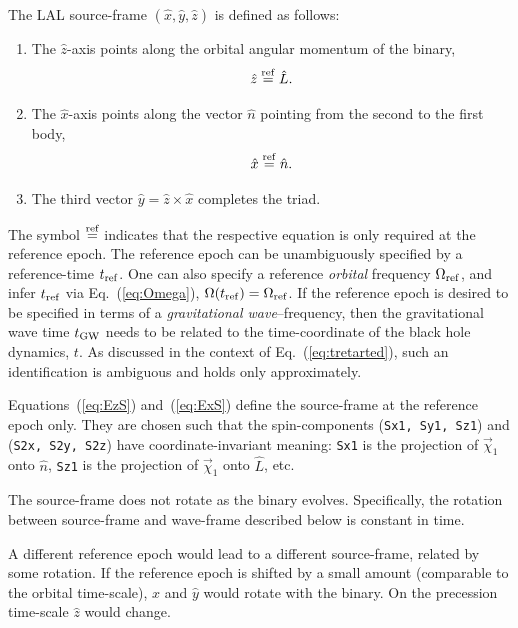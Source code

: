 \documentclass[11pt,tightenlines,article,amssymb,amsmath,amsfonts,superscriptaddress]{revtex4}
\newcommand{\nNR}{\hat{n}}
\newcommand{\lNR}{\hat L}
\newcommand{\tGW}{t_{\rm GW}}
\newcommand{\ExS}{{{\hat x}}}
\newcommand{\EyS}{{{\hat y}}}
\newcommand{\EzS}{{{\hat z}}}
\newcommand{\phiRef}{\Phi} %
\newcommand{\equalref}{\overset{\rm ref}{=}}
\begin{document}
The LAL source-frame $(\ExS, \EyS, \EzS)$ is defined as follows:
\begin{enumerate}
\item The $\EzS$-axis points along the orbital angular momentum of the binary,
  \begin{equation}\label{eq:EzS}
    \EzS\equalref \lNR.
  \end{equation}
\item The $\ExS$-axis points along the vector $\nNR$ pointing from the second
  to the first body,
  \begin{equation}\label{eq:ExS}
    \ExS\equalref\nNR.
  \end{equation}
\item The third vector $\EyS=\EzS\times\ExS$ completes the triad.
\end{enumerate}
The symbol $\equalref$ indicates that the
respective equation is only required at the reference epoch.  The
reference epoch can be unambiguously specified by a reference-time
$t_{\rm ref}$.  One can also specify a reference \emph{orbital}
frequency $\Omega_{\rm ref}$, and infer $t_{\rm ref}$ via
Eq.~(\ref{eq:Omega}), $\Omega(t_{\rm ref})=\Omega_{\rm ref}$.  If the
reference epoch is desired to be specified in terms of a
\emph{gravitational wave}--frequency, then the gravitational wave time
$\tGW$ needs to be related to the time-coordinate of the black hole
dynamics, $t$.  As discussed in the context of
Eq.~(\ref{eq:tretarted}), such an identification is ambiguous and
holds only approximately.

Equations~(\ref{eq:EzS}) and~(\ref{eq:ExS}) define the source-frame at
the reference epoch only.  They are chosen such that the
spin-components ({\tt Sx1, Sy1, Sz1}) and ({\tt S2x, S2y, S2z}) have
coordinate-invariant meaning: {\tt Sx1} is the projection of
$\vec\chi_1$ onto $\nNR$, {\tt Sz1} is the projection of $\vec\chi_1$
onto $\lNR$, etc.

The source-frame does not rotate as the binary evolves.  Specifically,
the rotation between source-frame and wave-frame described below is
constant in time.

A different reference epoch would lead to a different source-frame,
related by some rotation.  If the reference epoch is shifted by a
small amount (comparable to the orbital time-scale), $\ExS$ and $\EyS$
would rotate with the binary.  On the precession time-scale $\EzS$
would change.
\end{document}
